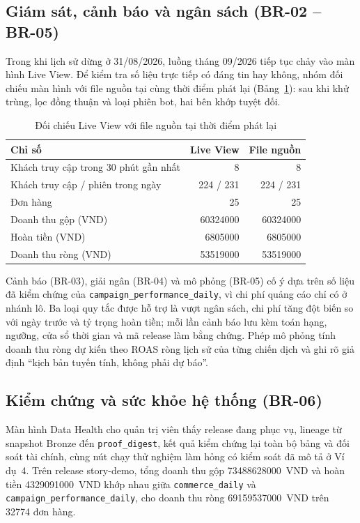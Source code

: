 \subsection{Giám sát, cảnh báo và ngân sách (BR-02 -- BR-05)}
\label{sec:c4-br02-05}
Trong khi lịch sử dừng ở 31/08/2026, luồng tháng 09/2026 tiếp tục chảy vào màn hình Live View. Để kiểm tra số liệu trực tiếp có đáng tin hay không, nhóm đối chiếu màn hình với file nguồn tại cùng thời điểm phát lại (Bảng~\ref{tab:live-check}): sau khi khử trùng, lọc đồng thuận và loại phiên bot, hai bên khớp tuyệt đối.

\begin{table}[H]
\centering
\caption{Đối chiếu Live View với file nguồn tại thời điểm phát lại}
\label{tab:live-check}
\small
\renewcommand{\arraystretch}{1.2}
\begin{tabular}{lrr}
\toprule
\textbf{Chỉ số} & \textbf{Live View} & \textbf{File nguồn} \\
\midrule
Khách truy cập trong 30 phút gần nhất & 8 & 8 \\
Khách truy cập / phiên trong ngày & 224 / 231 & 224 / 231 \\
Đơn hàng & 25 & 25 \\
Doanh thu gộp (VND) & \num{60324000} & \num{60324000} \\
Hoàn tiền (VND) & \num{6805000} & \num{6805000} \\
Doanh thu ròng (VND) & \num{53519000} & \num{53519000} \\
\bottomrule
\end{tabular}
\end{table}

Cảnh báo (BR-03), giải ngân (BR-04) và mô phỏng (BR-05) cố ý dựa trên số liệu đã kiểm chứng của \texttt{campaign\_performance\_daily}, vì chi phí quảng cáo chỉ có ở nhánh lô. Ba loại quy tắc được hỗ trợ là vượt ngân sách, chi phí tăng đột biến so với ngày trước và tỷ trọng hoàn tiền; mỗi lần cảnh báo lưu kèm toán hạng, ngưỡng, cửa sổ thời gian và mã release làm bằng chứng. Phép mô phỏng tính doanh thu ròng dự kiến theo ROAS ròng lịch sử của từng chiến dịch và ghi rõ giả định ``kịch bản tuyến tính, không phải dự báo''.

\subsection{Kiểm chứng và sức khỏe hệ thống (BR-06)}
\label{sec:c4-br06}
Màn hình Data Health cho quản trị viên thấy release đang phục vụ, lineage từ snapshot Bronze đến \texttt{proof\_digest}, kết quả kiểm chứng lại toàn bộ bảng và đối soát tài chính, cùng nút chạy thử nghiệm làm hỏng có kiểm soát đã mô tả ở Ví dụ~4. Trên release story-demo, tổng doanh thu gộp \num{73488628000}~VND và hoàn tiền \num{4329091000}~VND khớp nhau giữa \texttt{commerce\_daily} và \texttt{campaign\_performance\_daily}, cho doanh thu ròng \num{69159537000}~VND trên \num{32774} đơn hàng.

